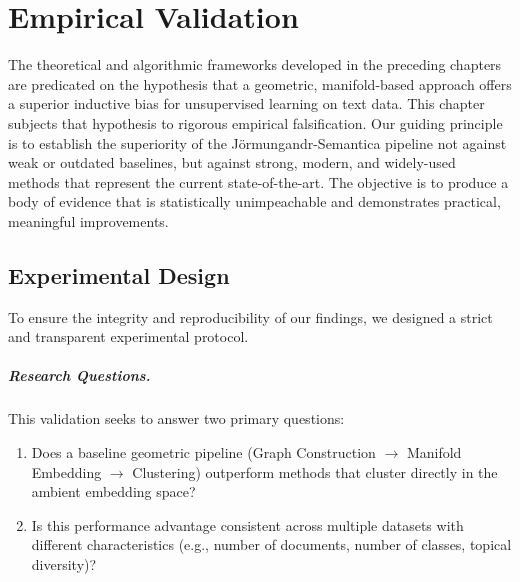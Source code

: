 \chapter{Empirical Validation}
\label{chap:validation}

The theoretical and algorithmic frameworks developed in the preceding chapters are predicated on the hypothesis that a geometric, manifold-based approach offers a superior inductive bias for unsupervised learning on text data. This chapter subjects that hypothesis to rigorous empirical falsification. Our guiding principle is to establish the superiority of the Jörmungandr-Semantica pipeline not against weak or outdated baselines, but against strong, modern, and widely-used methods that represent the current state-of-the-art. The objective is to produce a body of evidence that is statistically unimpeachable and demonstrates practical, meaningful improvements.

\section{Experimental Design}
\label{sec:exp_design}
To ensure the integrity and reproducibility of our findings, we designed a strict and transparent experimental protocol.

\paragraph{Research Questions.} This validation seeks to answer two primary questions:
\begin{enumerate}
    \item Does a baseline geometric pipeline (Graph Construction $\to$ Manifold Embedding $\to$ Clustering) outperform methods that cluster directly in the ambient embedding space?
    \item Is this performance advantage consistent across multiple datasets with different characteristics (e.g., number of documents, number of classes, topical diversity)?
\end{enumerate}

